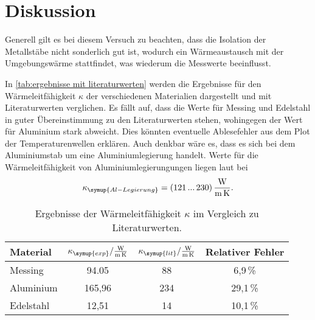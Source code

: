 \section{Diskussion}
\label{sec:Diskussion}
Generell gilt es bei diesem Versuch zu beachten, dass die Isolation der Metallstäbe nicht sonderlich gut ist, wodurch ein Wärmeaustausch mit der 
Umgebungswärme stattfindet, was wiederum die Messwerte beeinflusst.

In \autoref{tab:ergebnisse mit literaturwerten} werden die Ergebnisse für den Wärmeleitfähigkeit $\kappa$ der verschiedenen Materialien 
dargestellt und mit Literaturwerten verglichen. Es fällt auf, dass die Werte für Messing und Edelstahl in guter Übereinstimmung 
zu den Literaturwerten stehen, wohingegen der Wert für Aluminium stark abweicht. Dies könnten eventuelle Ablesefehler aus dem Plot
der Temperaturenwellen erklären. Auch denkbar wäre es, dass es sich bei dem Aluminiumstab um eine Aluminiumlegierung handelt. Werte für
die Wärmeleitfähigkeit von Aluminiumlegierungungen liegen laut \cite{czichos} bei
\begin{equation}
    \kappa_{\symup{Al-Legierung}} = (121\,...\,230)\,\unit{\watt\per\metre\per\kelvin}.
\end{equation}
\begin{table} [H]
    \centering
    \caption{Ergebnisse der Wärmeleitfähigkeit $\kappa$ im Vergleich zu Literaturwerten.}
    \label{tab:ergebnisse mit literaturwerten}
    \begin{tabular}{l S[table-format=3.2] S[table-format=3.0] S[table-format=2.1]}
      \toprule
      {Material} & {$\kappa_{\symup{exp}} / \frac{\unit{\watt}}{\unit{\metre\kelvin}}$} &%
      {$\kappa_{\symup{lit}} / \frac{\unit{\watt}}{\unit{\metre\kelvin}}$} & {Relativer Fehler} \\
      \midrule
        Messing     & 94.05  & 88  & 6,9\,\% \\ 
        Aluminium   & 165,96 & 234 & 29,1\,\%\\
        Edelstahl   & 12,51  & 14  & 10,1\,\%\\
      \bottomrule
    \end{tabular}
  \end{table}